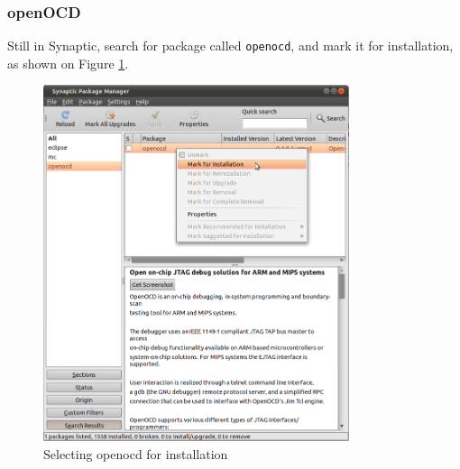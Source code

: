 \documentclass[a4paper, 10pt]{article}
\begin{document}
\subsubsection{openOCD}

Still in Synaptic, search for package called \verb+openocd+,
and mark it for installation, as shown on Figure \ref{fig:synaptic-openocd}.


    \begin{figure}[H]
    \centering
        \includegraphics[width=0.8\textwidth]{./install-guide-linux-images/synaptic-openocd.png}
        \caption{Selecting openocd for installation}
        \label{fig:synaptic-openocd}
    \end{figure}



\end{document}
